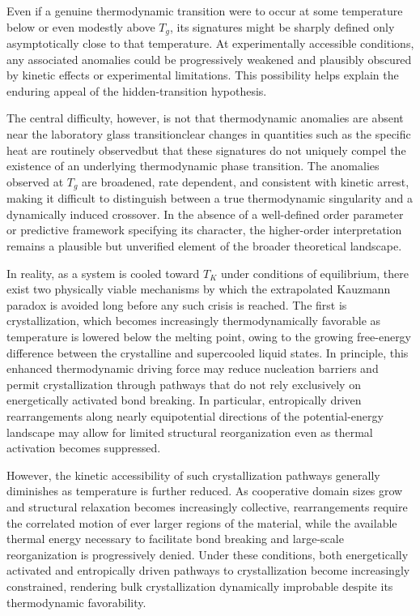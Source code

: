 Even if a genuine thermodynamic transition were to occur at some temperature below or even modestly above $T_g$, its signatures might be sharply defined only asymptotically close to that temperature. At experimentally accessible conditions, any associated anomalies could be progressively weakened and plausibly obscured by kinetic effects or experimental limitations. This possibility helps explain the enduring appeal of the hidden-transition hypothesis.

The central difficulty, however, is not that thermodynamic anomalies are absent near the laboratory glass transition\textemdash clear changes in quantities such as the specific heat are routinely observed\textemdash but that these signatures do not uniquely compel the existence of an underlying thermodynamic phase transition. The anomalies observed at $T_g$ are broadened, rate dependent, and consistent with kinetic arrest, making it difficult to distinguish between a true thermodynamic singularity and a dynamically induced crossover. In the absence of a well-defined order parameter or predictive framework specifying its character, the higher-order interpretation remains a plausible but unverified element of the broader theoretical landscape.

In reality, as a system is cooled toward $T_K$ under conditions of equilibrium, there exist two physically viable mechanisms by which the extrapolated Kauzmann paradox is avoided long before any such crisis is reached. The first is crystallization, which becomes increasingly thermodynamically favorable as temperature is lowered below the melting point, owing to the growing free-energy difference between the crystalline and supercooled liquid states. In principle, this enhanced thermodynamic driving force may reduce nucleation barriers and permit crystallization through pathways that do not rely exclusively on energetically activated bond breaking. In particular, entropically driven rearrangements along nearly equipotential directions of the potential-energy landscape may allow for limited structural reorganization even as thermal activation becomes suppressed.

However, the kinetic accessibility of such crystallization pathways generally diminishes as temperature is further reduced. As cooperative domain sizes grow and structural relaxation becomes increasingly collective, rearrangements require the correlated motion of ever larger regions of the material, while the available thermal energy necessary to facilitate bond breaking and large-scale reorganization is progressively denied. Under these conditions, both energetically activated and entropically driven pathways to crystallization become increasingly constrained, rendering bulk crystallization dynamically improbable despite its thermodynamic favorability.

